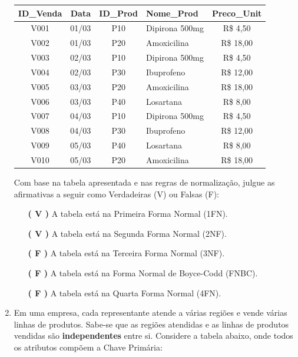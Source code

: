 \documentclass[12pt,a4paper]{article}
\begin{document}
\begin{enumerate}
    \begin{center}
        \small
        \begin{tabular}{|c|c|c|l|c|}
            \hline
            \cellcolor{gray!20}\textbf{ID\_Venda} & \cellcolor{gray!20}\textbf{Data} & \cellcolor{gray!20}\textbf{ID\_Prod} & \cellcolor{gray!20}\textbf{Nome\_Prod} & \cellcolor{gray!20}\textbf{Preco\_Unit} \\ \hline
            V001 & 01/03 & P10 & Dipirona 500mg & R\$ 4,50 \\ \hline
            V002 & 01/03 & P20 & Amoxicilina & R\$ 18,00 \\ \hline
            V003 & 02/03 & P10 & Dipirona 500mg & R\$ 4,50 \\ \hline
            V004 & 02/03 & P30 & Ibuprofeno & R\$ 12,00 \\ \hline
            V005 & 03/03 & P20 & Amoxicilina & R\$ 18,00 \\ \hline
            V006 & 03/03 & P40 & Losartana & R\$ 8,00 \\ \hline
            V007 & 04/03 & P10 & Dipirona 500mg & R\$ 4,50 \\ \hline
            V008 & 04/03 & P30 & Ibuprofeno & R\$ 12,00 \\ \hline
            V009 & 05/03 & P40 & Losartana & R\$ 8,00 \\ \hline
            V010 & 05/03 & P20 & Amoxicilina & R\$ 18,00 \\ \hline
        \end{tabular}
    \end{center}

    Com base na tabela apresentada e nas regras de normalização, julgue as afirmativas a seguir como Verdadeiras (V) ou Falsas (F):

    \begin{enumerate}[label=( \quad )]
        \item[\textbf{( V )}] A tabela está na Primeira Forma Normal (1FN).
        \item[\textbf{( V )}] A tabela está na Segunda Forma Normal (2NF).
        \item[\textbf{( F )}] A tabela está na Terceira Forma Normal (3NF).
        \item[\textbf{( F )}] A tabela está na Forma Normal de Boyce-Codd (FNBC).
        \item[\textbf{( F )}] A tabela está na Quarta Forma Normal (4FN).
    \end{enumerate}

    \item Em uma empresa, cada representante atende a várias regiões e vende várias linhas de produtos. Sabe-se que as regiões atendidas e as linhas de produtos vendidas são \textbf{independentes} entre si. Considere a tabela abaixo, onde todos os atributos compõem a Chave Primária:


\end{enumerate}
\end{document}
